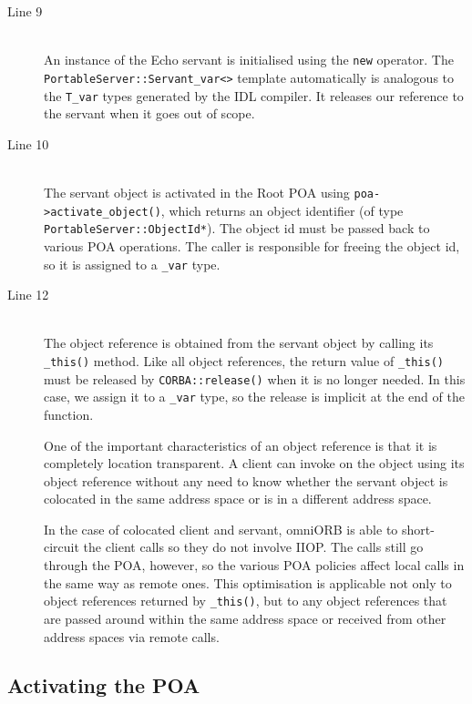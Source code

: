 \documentclass[11pt,oneside,a4paper]{book}
\newcommand{\type}[1]{\texttt{#1}}
\newcommand{\code}[1]{\texttt{#1}}
\newcommand{\op}[1]{\texttt{#1()}}
\newcommand{\dsc}{\discretionary{}{}{}}
\begin{document}
\begin{description}

\item[Line 9]\mbox{}\\
%
An instance of the Echo servant is initialised using the \code{new}
operator. The \type{PortableServer::Servant\_var<>} template
automatically is analogous to the \type{T\_var} types generated by the
IDL compiler. It releases our reference to the servant when it goes
out of scope.

\item[Line 10]\mbox{}\\
%
The servant object is activated in the Root POA using
\op{poa->activate\_\dsc{}object}, which returns an object identifier
(of type \type{PortableServer::\dsc{}ObjectId*}). The object id must
be passed back to various POA operations. The caller is responsible
for freeing the object id, so it is assigned to a \type{\_var} type.

\item[Line 12]\mbox{}\\
%
The object reference is obtained from the servant object by calling
its \op{\_this} method. Like all object references, the return value
of \op{\_this} must be released by \op{CORBA::release} when it is no
longer needed. In this case, we assign it to a \type{\_var} type, so
the release is implicit at the end of the function.

One of the important characteristics of an object reference is that it
is completely location transparent. A client can invoke on the object
using its object reference without any need to know whether the
servant object is colocated in the same address space or is in a
different address space.

In the case of colocated client and servant, omniORB is able to
short-circuit the client calls so they do not involve IIOP. The calls
still go through the POA, however, so the various POA policies affect
local calls in the same way as remote ones. This optimisation is
applicable not only to object references returned by \op{\_this}, but
to any object references that are passed around within the same
address space or received from other address spaces via remote calls.

\end{description}


\subsection{Activating the POA}
\end{document}
